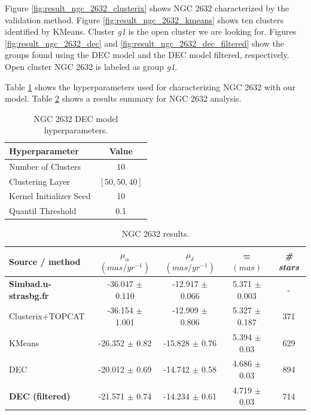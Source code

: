 \documentclass[11pt, a4paper, english]{book}
\begin{document}
\newpage

Figure \ref{fig:result_ngc_2632_clusterix} shows NGC 2632 characterized by the validation method.
Figure \ref{fig:result_ngc_2632_kmeans} shows ten clusters identified by KMeans.
Cluster \emph{g1} is the open cluster we are looking for.
Figures \ref{fig:result_ngc_2632_dec} and \ref{fig:result_ngc_2632_dec_filtered}
show the groups found using the DEC model and the DEC model filtered, respectively.
Open cluster NGC 2632 is labeled as group \emph{g1}.

Table \ref{tab:hyperparameters_ngc_2632} shows the hyperparameters used for characterizing NGC 2632
with our model. Table \ref{tab:results_ngc_2632} shows a results summary for NGC 2632 analysis.

\vfill

\begin{table}[h]
  \begin{center}
    \begin{tabular}{l|c}
      \textbf{Hyperparameter} & \textbf{Value} \\
      \hline
      Number of Clusters & 10 \\
      Clustering Layer & $\left[ 50, 50, 40 \right]$ \\
      Kernel Initializer Seed & 10 \\
      Quantil Threshold & 0.1 \\
    \end{tabular}
    \caption{NGC 2632 DEC model hyperparameters.}
    \label{tab:hyperparameters_ngc_2632}
  \end{center}
\end{table}

\vfill

\begin{table}[h]
  \begin{center}
    \begin{tabular}{l|c|c|c|c}
      \textbf{Source / method} & \emph{$\mu_{\alpha}$ $(mas/yr^{-1})$} & \emph{$\mu_{\delta}$ $(mas/yr^{-1})$} & \emph{$\varpi$ $(mas)$} & \emph{\# stars} \\
      \hline
      \textbf{Simbad.u-strasbg.fr} & -36.047 $\pm$ 0.110 & -12.917 $\pm$ 0.066 & 5.371 $\pm$ 0.003 & - \\
      Clusterix+TOPCAT & -36.154 $\pm$ 1.001 & -12.909 $\pm$ 0.806 & 5.327 $\pm$ 0.187 & 371 \\
      KMeans & -26.352 $\pm$ 0.82 & -15.828 $\pm$ 0.76 & 5.394 $\pm$ 0.03 & 629 \\
      DEC & -20.012 $\pm$ 0.69 & -14.742 $\pm$ 0.58 & 4.686 $\pm$ 0.03 & 894 \\
      \textbf{DEC (filtered)} & -21.571 $\pm$ 0.74 & -14.234 $\pm$ 0.61 & 4.719 $\pm$ 0.03 & 714 \\
    \end{tabular}
    \caption{NGC 2632 results.}
    \label{tab:results_ngc_2632}
  \end{center}
\end{table}
\end{document}
